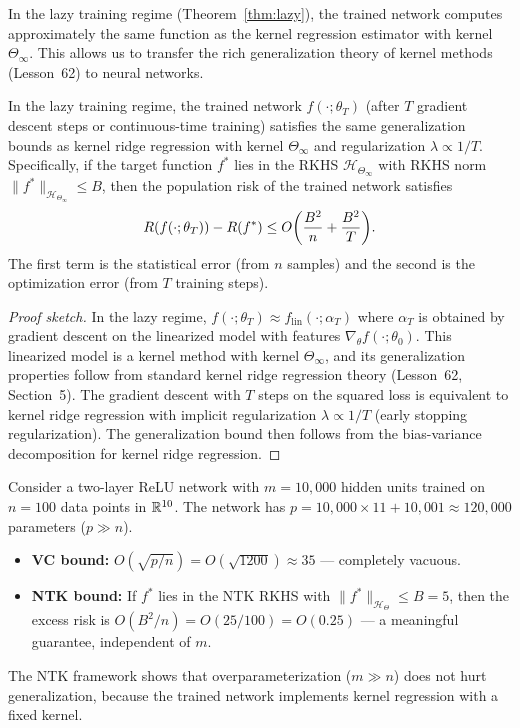 \documentclass[11pt,a4paper]{article}
\begin{document}
In the lazy training regime (Theorem~\ref{thm:lazy}), the trained
network computes approximately the same function as the kernel
regression estimator with kernel $\Theta_\infty$.  This allows us
to transfer the rich generalization theory of kernel methods
(Lesson~62) to neural networks.

\begin{proposition}
\label{prop:ntk-generalization}
In the lazy training regime, the trained network $f(\cdot; \theta_T)$
(after $T$ gradient descent steps or continuous-time training)
satisfies the same generalization bounds as kernel ridge regression
with kernel $\Theta_\infty$ and regularization $\lambda \propto 1/T$.
Specifically, if the target function $f^*$ lies in the RKHS
$\mathcal{H}_{\Theta_\infty}$ with RKHS norm
$\|f^*\|_{\mathcal{H}_{\Theta_\infty}} \le B$, then the population
risk of the trained network satisfies
\[
  R(f(\cdot; \theta_T)) - R(f^*)
  \le O\biggl( \frac{B^2}{n} + \frac{B^2}{T} \biggr).
\]
The first term is the statistical error (from $n$ samples) and the
second is the optimization error (from $T$ training steps).
\end{proposition}

\begin{proof}[Proof sketch]
In the lazy regime, $f(\cdot; \theta_T) \approx f_{\text{lin}}
(\cdot; \alpha_T)$ where $\alpha_T$ is obtained by gradient descent
on the linearized model with features $\nabla_\theta f(\cdot;
\theta_0)$.  This linearized model is a kernel method with kernel
$\Theta_\infty$, and its generalization properties follow from
standard kernel ridge regression theory (Lesson~62, Section~5).
The gradient descent with $T$ steps on the squared loss is equivalent
to kernel ridge regression with implicit regularization
$\lambda \propto 1/T$ (early stopping regularization).  The
generalization bound then follows from the bias-variance decomposition
for kernel ridge regression.
\end{proof}

\begin{example}
\label{ex:ntk-gen}
Consider a two-layer ReLU network with $m = 10{,}000$ hidden units
trained on $n = 100$ data points in $\mathbb{R}^{10}$.  The network has
$p = 10{,}000 \times 11 + 10{,}001 \approx 120{,}000$ parameters
($p \gg n$).

\begin{itemize}[nosep]
  \item \textbf{VC bound:} $O(\sqrt{p/n}) = O(\sqrt{1200}) \approx
    35$ --- completely vacuous.
  \item \textbf{NTK bound:} If $f^*$ lies in the NTK RKHS with
    $\|f^*\|_{\mathcal{H}_\Theta} \le B = 5$, then the excess risk
    is $O(B^2/n) = O(25/100) = O(0.25)$ --- a meaningful guarantee,
    independent of $m$.
\end{itemize}
The NTK framework shows that overparameterization ($m \gg n$) does
not hurt generalization, because the trained network implements
kernel regression with a fixed kernel.
\end{example}
\end{document}
